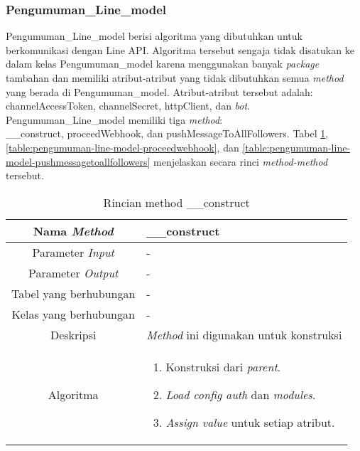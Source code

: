 \subsubsection{Pengumuman\_Line\_model}
Pengumuman\_Line\_model berisi algoritma yang dibutuhkan untuk berkomunikasi dengan Line API. Algoritma tersebut sengaja tidak disatukan ke dalam kelas Pengumuman\_model karena menggunakan banyak \textit{package} tambahan dan memiliki atribut-atribut yang tidak dibutuhkan semua \textit{method} yang berada di Pengumuman\_model. Atribut-atribut tersebut adalah: \textdollar channelAccessToken, \textdollar channelSecret, \textdollar httpClient, dan \textdollar \textit{bot}. Pengumuman\_Line\_model memiliki tiga \textit{method}: \\
\_\_construct, proceedWebhook, dan pushMessageToAllFollowers. Tabel \ref{table:pengumuman-line-model-construct}, \ref{table:pengumuman-line-model-proceedwebhook}, dan \ref{table:pengumuman-line-model-pushmessagetoallfollowers} menjelaskan secara rinci \textit{method-method} tersebut.

\begin{center}
	\begin{table}[H]
	\caption{Rincian method \_\_construct}
	\label{table:pengumuman-line-model-construct}
\begin{tabular}{|c|p{11cm}|}
\hline
Nama \textit{Method} 	& 	 	\_\_construct \\
\hline
Parameter \textit{Input} & - \\
\hline
Parameter \textit{Output} & - \\
\hline
Tabel yang berhubungan & -\\
\hline
Kelas yang berhubungan &  - \\
\hline
Deskripsi	& \textit{Method} ini digunakan untuk konstruksi\\
\hline
Algoritma	& \begin{enumerate}
				\item Konstruksi dari \textit{parent}.
				\item \textit{Load config auth} dan \textit{modules}.
				\item \textit{Assign value} untuk setiap atribut.
				\end{enumerate} \\
\hline
\end{tabular}
\end{table}
\end{center}

